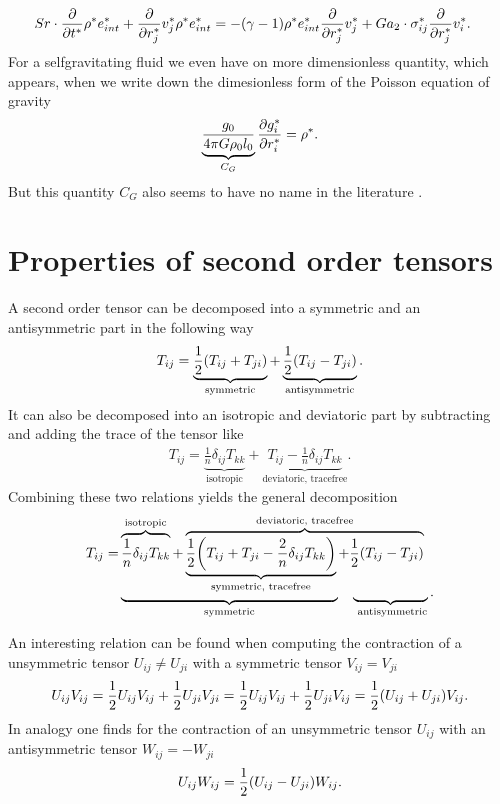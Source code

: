 \begin{align*}
 Sr \cdot \pd{t^*}\rho^* e_{int}^* 
+ \pd{r_j^*} v_j^* \rho^* e_{int}^* &= 
-(\gamma-1) \rho^* e_{int}^* \pd{r_j^*}v_j^*
+Ga_2 \cdot \sigma_{ij}^* \pd{r_j^*}v_i^*.
\end{align*}
For a selfgravitating fluid we even have on more dimensionless quantity, which
appears, when we write down the dimesionless form of the Poisson equation of
gravity
\begin{align}
\underbrace{\frac{g_0}{4\pi G \rho_0 l_0}}_{C_G}\ppd{r_i^*}{g_i^*} = \rho^*.
\end{align}
But this quantity $C_G$ also seems to have no name in the literature
\citep[e.g.][]{Durst2007}.


\chapter{Properties of second order tensors}
A second order tensor can be decomposed into a symmetric and an antisymmetric
part in the following way
\begin{align}
T_{ij}=\underbrace{\frac{1}{2}\lra{T_{ij}+T_{ji}}}_{\text{symmetric}}
+\underbrace{\frac{1}{2}\lra{T_{ij}-T_{ji}}}_{\text{antisymmetric}}.
\end{align}
It can also be decomposed into an isotropic and deviatoric part by subtracting
and adding the trace of the tensor like
\begin{align}
T_{ij}=\underbrace{\frac{1}{n}\delta_{ij} T_{kk}}_{\text{isotropic}}
+\underbrace{T_{ij}-\frac{1}{n}\delta_{ij} T_{kk}}_{\text{deviatoric, 
tracefree}}.
\end{align}
Combining these two relations yields the general decomposition
\begin{align}
\begin{split}
T_{ij}=&
\overbrace{\frac{1}{n}\delta_{ij} T_{kk}}^{\text{isotropic}}
+
\overbrace{
\underbrace{\frac{1}{2}\lra{T_{ij}+T_{ji}-\frac{2}{n}\delta_{ij}
T_{kk}}}_{\text{symmetric, tracefree}}
+\frac{1}{2}\lra{T_{ij}-T_{ji}}}^{\text{deviatoric, tracefree}}\\[-1em]
&\underbrace{\hphantom{\frac{1}{n}\delta_{ij}
T_{kk}+\frac{1}{2}\lra{T_{ij}+T_{ji}-\frac{2}{n}\delta_{ij}
T_{kk}}}}_{\text{symmetric}}
\hphantom{+}
\underbrace{\hphantom{\frac{1}{2}\lra{T_{ij}-T_{ji}}}}_{\text{
antisymmetric}}.
\end{split}
\end{align}

An interesting relation can be found when computing the contraction of a
unsymmetric tensor $U_{ij} \neq U_{ji}$ with a  symmetric tensor
$V_{ij}=V_{ji}$
\begin{align}
U_{ij}V_{ij}
= \frac{1}{2} U_{ij}V_{ij} + \frac{1}{2} U_{ji}V_{ji} 
= \frac{1}{2} U_{ij}V_{ij} + \frac{1}{2} U_{ji}V_{ij}
= \frac{1}{2} \lra{U_{ij}+U_{ji}} V_{ij}.
\label{eq:uscontr}
\end{align}
In analogy one finds for the contraction of an unsymmetric tensor $U_{ij}$ with
an
antisymmetric tensor $W_{ij}=-W_{ji}$
\begin{align}
U_{ij}W_{ij} = \frac{1}{2} \lra{U_{ij}-U_{ji}} W_{ij}.
\label{eq:uascontr}
\end{align}

